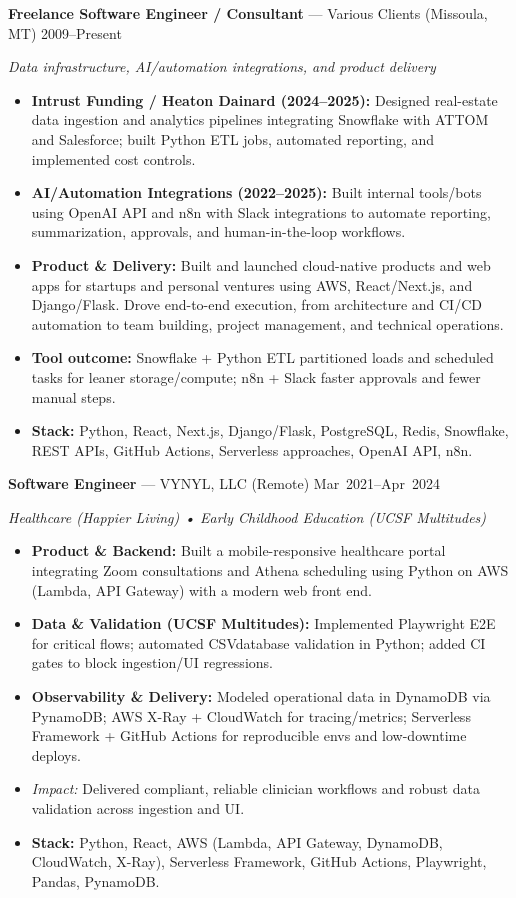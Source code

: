 \documentclass[10pt]{article}
\begin{document}
\noindent\textbf{Freelance Software Engineer / Consultant} — Various Clients (Missoula, MT) \hfill 2009--Present\par
\emph{Data infrastructure, AI/automation integrations, and product delivery}\par
\begin{itemize}
  \item \textbf{Intrust Funding / Heaton Dainard (2024--2025):} Designed real-estate data ingestion and analytics pipelines integrating Snowflake with ATTOM and Salesforce; built Python ETL jobs, automated reporting, and implemented cost controls.
  \item \textbf{AI/Automation Integrations (2022--2025):} Built internal tools/bots using OpenAI API and n8n with Slack integrations to automate reporting, summarization, approvals, and human-in-the-loop workflows.
  \item \textbf{Product \& Delivery:} Built and launched cloud-native products and web apps for startups and personal ventures using AWS, React/Next.js, and Django/Flask. Drove end-to-end execution, from architecture and CI/CD automation to team building, project management, and technical operations.
  \item \textbf{Tool \textrightarrow{} outcome:} Snowflake + Python ETL \textrightarrow{} partitioned loads and scheduled tasks for leaner storage/compute; n8n + Slack \textrightarrow{} faster approvals and fewer manual steps.
  \item \textbf{Stack:} Python, React, Next.js, Django/Flask, PostgreSQL, Redis, Snowflake, REST APIs, GitHub Actions, Serverless approaches, OpenAI API, n8n.
\end{itemize}

\noindent\textbf{Software Engineer} — VYNYL, LLC (Remote) \hfill Mar~2021--Apr~2024\par
\emph{Healthcare (Happier Living) • Early Childhood Education (UCSF Multitudes)}\par
\begin{itemize}
  \item \textbf{Product \& Backend:} Built a mobile-responsive healthcare portal integrating Zoom consultations and Athena scheduling using Python on AWS (Lambda, API Gateway) with a modern web front end.
  \item \textbf{Data \& Validation (UCSF Multitudes):} Implemented Playwright E2E for critical flows; automated CSV\textrightarrow{}database validation in Python; added CI gates to block ingestion/UI regressions.
  \item \textbf{Observability \& Delivery:} Modeled operational data in DynamoDB via PynamoDB; AWS X-Ray + CloudWatch for tracing/metrics; Serverless Framework + GitHub Actions for reproducible envs and low-downtime deploys.
  \item \textit{Impact:} Delivered compliant, reliable clinician workflows and robust data validation across ingestion and UI.
  \item \textbf{Stack:} Python, React, AWS (Lambda, API Gateway, DynamoDB, CloudWatch, X-Ray), Serverless Framework, GitHub Actions, Playwright, Pandas, PynamoDB.
\end{itemize}
\end{document}
